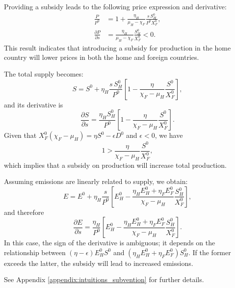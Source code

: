 Providing a subsidy leads to the following price expression and derivative:
\begin{align*}
\frac{P}{P^0} &= 1 + \frac{\eta_H}{\mu_H - \chi_F} \frac{s \, S_H^0}{P^0 X_F^0}, \\
\frac{\partial P}{\partial s} &= \frac{\eta_H}{\mu_H - \chi_F} \frac{S_H^0}{X_F^0} < 0.
\end{align*}
This result indicates that introducing a subsidy for production in the home country will lower prices in both the home and foreign countries.

The total supply becomes:
$$
S = S^0 + \eta_H \frac{s \, S_H^0}{P^0}\left[1 - \frac{\eta}{\chi_F - \mu_H}\frac{S^0}{X_F^0}\right],
$$
and its derivative is
$$
\frac{\partial S}{\partial s} = \frac{\eta_H S_H^0}{P^0}\left[1 - \frac{\eta}{\chi_F - \mu_H}\frac{S^0}{X_F^0}\right].
$$
Given that $X_F^0(\chi_F - \mu_H) = \eta S^0 - \epsilon D^0$ and $\epsilon < 0$, we have
$$
1 > \frac{\eta}{\chi_F - \mu_H}\frac{S^0}{X_F^0},
$$
which implies that a subsidy on production will increase total production.

Assuming emissions are linearly related to supply, we obtain:
$$ 
E = E^0 + \eta_H \frac{s}{P^0}\left[E_H^0 - \frac{\eta_H E_H^0 + \eta_F E_F^0}{\chi_F - \mu_H}\frac{S_H^0}{X_F^0}\right],
$$ 
and therefore
$$
\frac{\partial E}{\partial s} = \frac{\eta_H}{P^0}\left[E_H^0 - \frac{\eta_H E_H^0 + \eta_F E_F^0}{\chi_F - \mu_H}\frac{S_H^0}{X_F^0}\right].
$$
In this case, the sign of the derivative is ambiguous; it depends on the relationship between $(\eta - \epsilon)E_H^0 S^0$ and $(\eta_H E_H^0 + \eta_F E_F^0) S_H^0$. If the former exceeds the latter, the subsidy will lead to increased emissions.

See Appendix \ref{appendix:intuitions_subvention} for further details.

